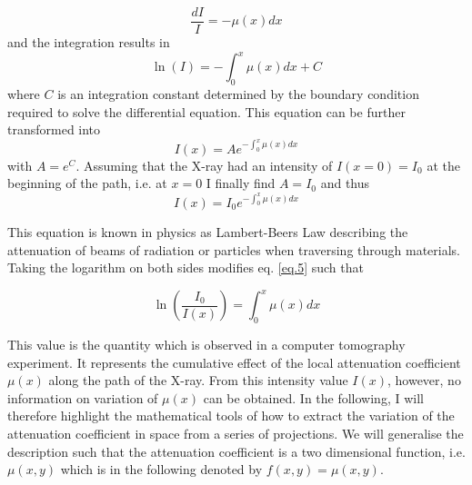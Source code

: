 \documentclass[12pt]{article}
\begin{document}
\begin{equation}\label{eq.2}
\frac{dI}{I}=-\mu(x)dx
\end{equation}	
and the integration results in
\begin{equation}\label{eq.3}
	\ln(I)=-\int_{0}^{x} \mu(x)dx +C
\end{equation}
where $C$ is an integration constant determined by the boundary condition required to solve the differential equation. This equation can be further transformed into
\begin{equation}\label{eq.4}
I(x)=Ae^{-\int_{0}^{x} \mu(x)dx}	
\end{equation}
with $A=e^{C}$. Assuming that the X-ray had an intensity of $I(x=0)=I_{0}$ at the beginning of the path, i.e. at $x=0$ I finally find $A=I_{0}$ and thus
\begin{equation}\label{eq.5}
I(x)=I_{0}e^{-\int_{0}^{x} \mu(x)dx}	
\end{equation}

This equation is known in physics as Lambert-Beers Law describing the attenuation of beams of radiation or particles when traversing through materials. Taking the logarithm on both sides modifies eq. \ref{eq.5} such that 

\begin{equation}\label{eq.6}
	\ln\left (\frac{I_{0}}{I(x)}\right )=\int_{0}^{x}\mu(x)dx
\end{equation}

This value is the quantity which is observed in a computer tomography experiment. It represents the cumulative effect of the local attenuation coefficient $\mu(x)$ along the path of the X-ray. From this intensity value $I(x)$, however, no information on variation of $\mu(x)$ can be obtained. In the following, I will therefore highlight the mathematical tools of how to extract the variation of the attenuation coefficient in space from a series of projections. We will generalise the description such that the attenuation coefficient is a two dimensional function, i.e. $\mu(x,y)$ which is in the following denoted by $f(x,y)=\mu(x,y)$.
\end{document}
